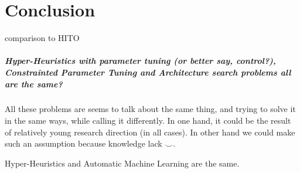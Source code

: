 \chapter{Conclusion}
comparison to HITO~\cite{guizzo2015hyper}

\paragraph{Hyper-Heuristics with parameter tuning (or better say, control?), Constrainted Parameter Tuning and Architecture search problems all are the same?}
All these problems are seems to talk about the same thing, and trying to solve it in the same ways, while calling it differently. In one hand, it could be the result of relatively young research direction (in all cases). In other hand we could make such an assumption because knowledge lack $\smile$.

Hyper-Heuristics and Automatic Machine Learning are the same.